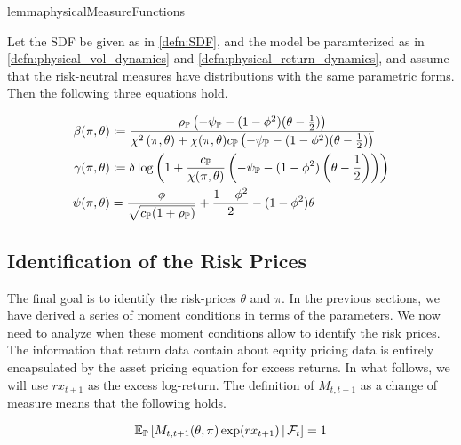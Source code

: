 \documentclass[11pt, letterpaper, twoside, final]{article}
\begin{document}
\begin{restatable}{lemma}{physicalMeasureFunctions}

    
    Let the SDF be given as in \cref{defn:SDF}, and the model be paramterized as in
    \cref{defn:physical_vol_dynamics} and \cref{defn:physical_return_dynamics}, and assume that the risk-neutral
    measures have distributions with the same parametric forms.
    Then the following three equations hold.


    \begin{align}
        \label{eqn:beta_function}
        \beta(\pi, \theta) &\coloneqq \frac{\rho_{\mathbb{P}} \left(-\psi_{\mathbb{P}} - (1- \phi^2)(\theta -
        \frac{1}{2})\right)}{\chi^2\left(\pi, \theta\right) + \chi(\pi, \theta)c_{\mathbb{P}} \left(-\psi_{\mathbb{P}} - (1-
        \phi^2)(\theta-\frac{1}{2} )\right)}  \\
        \label{eqn:gamma_function}
        \gamma(\pi, \theta) &\coloneqq \delta \log\left(1 + \frac{c_{\mathbb{P}}}{\chi(\pi,\theta)} \left(-\psi_{\mathbb{P}} - (1-
        \phi^2)\left(\theta - \frac{1}{2}\right) \right)\right) \\
        \label{eqn:psi_function}
        \psi(\pi, \theta) &= \frac{\phi}{\sqrt{c_{\mathbb{P}} (1 + \rho_{\mathbb{P}})}} + \frac{1 - \phi^2}{2} - (1 - \phi^2)
        \theta 
    \end{align}

\end{restatable}


\subsection{Identification of the Risk Prices}

The final goal is to identify the risk-prices $\theta$ and $\pi$.
In the previous sections, we have derived a series of moment conditions in terms of the parameters.
We now need to analyze when these moment conditions allow to identify the risk prices. 
The information that return data contain about equity pricing data is entirely encapsulated by the asset pricing
equation for excess returns.  
In what follows, we will use $rx_{t+1}$ as the excess log-return.
The definition of $M_{t,t+1}$ as a change of measure means that the following holds.

\begin{equation}
    \operatorname{\mathbb{E}}_{\mathbb{P}}\left[ M_{t,t+1}(\theta, \pi) \exp(rx_{t+1}) \,\middle\vert\, \mathcal{F}_{t} \right] = 1
\end{equation}
\end{document}
